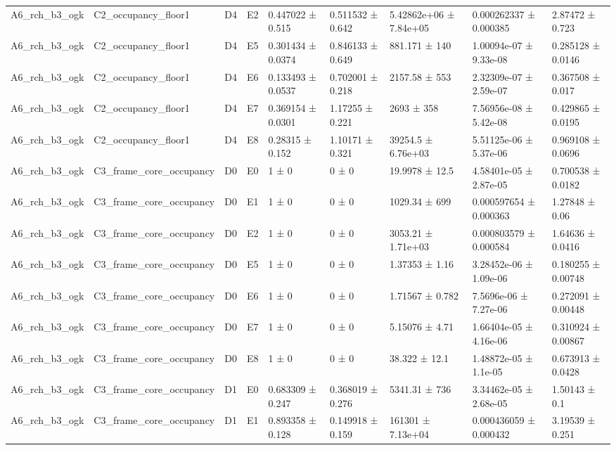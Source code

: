 \begin{table}
\begin{tabular}{lllllllll}
A6\_rch\_b3\_ogk & C2\_occupancy\_floor1 & D4 & E2 & 0.447022 ± 0.515 & 0.511532 ± 0.642 & 5.42862e+06 ± 7.84e+05 & 0.000262337 ± 0.000385 & 2.87472 ± 0.723 \\
A6\_rch\_b3\_ogk & C2\_occupancy\_floor1 & D4 & E5 & 0.301434 ± 0.0374 & 0.846133 ± 0.649 & 881.171 ± 140 & 1.00094e-07 ± 9.33e-08 & 0.285128 ± 0.0146 \\
A6\_rch\_b3\_ogk & C2\_occupancy\_floor1 & D4 & E6 & 0.133493 ± 0.0537 & 0.702001 ± 0.218 & 2157.58 ± 553 & 2.32309e-07 ± 2.59e-07 & 0.367508 ± 0.017 \\
A6\_rch\_b3\_ogk & C2\_occupancy\_floor1 & D4 & E7 & 0.369154 ± 0.0301 & 1.17255 ± 0.221 & 2693 ± 358 & 7.56956e-08 ± 5.42e-08 & 0.429865 ± 0.0195 \\
A6\_rch\_b3\_ogk & C2\_occupancy\_floor1 & D4 & E8 & 0.28315 ± 0.152 & 1.10171 ± 0.321 & 39254.5 ± 6.76e+03 & 5.51125e-06 ± 5.37e-06 & 0.969108 ± 0.0696 \\
A6\_rch\_b3\_ogk & C3\_frame\_core\_occupancy & D0 & E0 & 1 ± 0 & 0 ± 0 & 19.9978 ± 12.5 & 4.58401e-05 ± 2.87e-05 & 0.700538 ± 0.0182 \\
A6\_rch\_b3\_ogk & C3\_frame\_core\_occupancy & D0 & E1 & 1 ± 0 & 0 ± 0 & 1029.34 ± 699 & 0.000597654 ± 0.000363 & 1.27848 ± 0.06 \\
A6\_rch\_b3\_ogk & C3\_frame\_core\_occupancy & D0 & E2 & 1 ± 0 & 0 ± 0 & 3053.21 ± 1.71e+03 & 0.000803579 ± 0.000584 & 1.64636 ± 0.0416 \\
A6\_rch\_b3\_ogk & C3\_frame\_core\_occupancy & D0 & E5 & 1 ± 0 & 0 ± 0 & 1.37353 ± 1.16 & 3.28452e-06 ± 1.09e-06 & 0.180255 ± 0.00748 \\
A6\_rch\_b3\_ogk & C3\_frame\_core\_occupancy & D0 & E6 & 1 ± 0 & 0 ± 0 & 1.71567 ± 0.782 & 7.5696e-06 ± 7.27e-06 & 0.272091 ± 0.00448 \\
A6\_rch\_b3\_ogk & C3\_frame\_core\_occupancy & D0 & E7 & 1 ± 0 & 0 ± 0 & 5.15076 ± 4.71 & 1.66404e-05 ± 4.16e-06 & 0.310924 ± 0.00867 \\
A6\_rch\_b3\_ogk & C3\_frame\_core\_occupancy & D0 & E8 & 1 ± 0 & 0 ± 0 & 38.322 ± 12.1 & 1.48872e-05 ± 1.1e-05 & 0.673913 ± 0.0428 \\
A6\_rch\_b3\_ogk & C3\_frame\_core\_occupancy & D1 & E0 & 0.683309 ± 0.247 & 0.368019 ± 0.276 & 5341.31 ± 736 & 3.34462e-05 ± 2.68e-05 & 1.50143 ± 0.1 \\
A6\_rch\_b3\_ogk & C3\_frame\_core\_occupancy & D1 & E1 & 0.893358 ± 0.128 & 0.149918 ± 0.159 & 161301 ± 7.13e+04 & 0.000436059 ± 0.000432 & 3.19539 ± 0.251 \\

\end{tabular}
\end{table}
